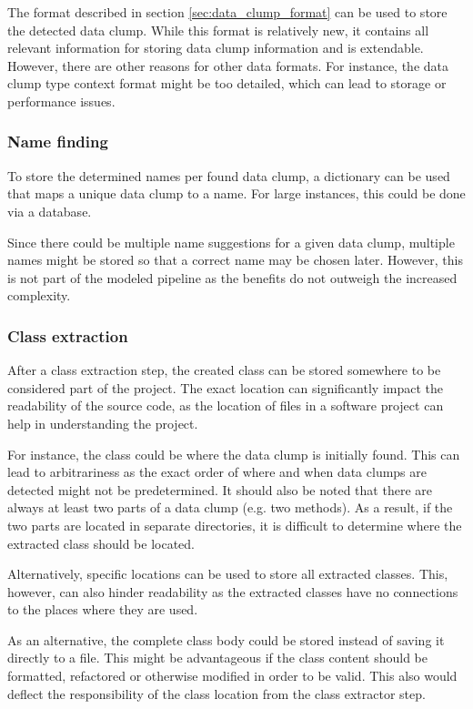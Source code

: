 The format described in section \ref{sec:data_clump_format} can be used to store the detected data clump. While this format is relatively new, it contains all relevant information for storing data clump information and is extendable. However, there are other reasons for other data formats. For instance,  the data clump type context format might be too detailed, which can lead to storage or performance issues. 

\subsubsection{Name finding}
To store the determined names per found data clump, a dictionary can be used that maps a unique data clump to a name. For large instances, this could be done via a database. 

Since there could be multiple name suggestions for a given data clump, multiple names might be stored so that a correct name may be chosen later. However, this is not part of the modeled pipeline as the benefits do not outweigh the increased complexity.

\subsubsection{Class extraction}

After a class extraction step, the created class can be stored somewhere to be considered part of the project. The exact location can significantly impact the readability of the source code, as the location of files in a software project can help in understanding the project. 

For instance, the class could be where the data clump is initially found. This can lead to arbitrariness as the exact order of where and when data clumps are detected might not be predetermined. It should also be noted that there are always at least two parts of a data clump (e.g. two methods). As a result, if the two parts are located in separate directories, it is difficult to determine where the extracted class should be located. 

Alternatively, specific locations can be used to store all extracted classes. This, however, can also hinder readability as the extracted classes have no connections to the places where they are used. 

As an alternative, the complete class body could be stored instead of saving it directly to a file. This might be advantageous if the class content should be formatted, refactored or otherwise modified in order to be valid. This also would deflect the responsibility of the class location from the class extractor step. 

